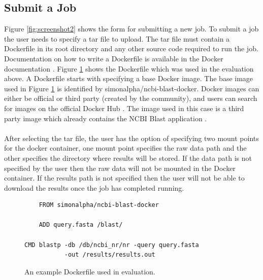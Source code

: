 \documentclass{sig-alternate-05-2015}
\begin{document}
\subsection{Submit a Job}
Figure \ref{fig:screenshot2} shows the form for submitting a new job. 
To submit a job the user needs to specify a tar file to upload. The tar file must contain a Dockerfile in its root directory and any other source code required to run the job. Documentation on how to write a Dockerfile is available in the Docker documentation \cite{dockerfile}. Figure \ref{fig:dockerfile} shows the Dockerfile which was used in the evaluation above. A Dockerfile starts with specifying a base Docker image. The base image used in Figure \ref{fig:dockerfile} is identified by simonalpha/ncbi-blast-docker. Docker images can either be official or third party (created by the community), and users can search for images on the official Docker Hub \cite{dockerhub}. The image used in this case is a third party image which already contains the NCBI Blast application \cite{dockerblast}.
\\\\
After selecting the tar file, the user has the option of specifying two mount points for the docker container, one mount point specifies the raw data path and the other specifies the directory where results will be stored. If the data path is not specified by the user then the raw data will not be mounted in the Docker container. If the results path is not specified then the user will not be able to download the results once the job has completed running.

\begin{figure}
	\begin{verbatim}
	FROM simonalpha/ncbi-blast-docker

	ADD query.fasta /blast/

CMD blastp -db /db/ncbi_nr/nr -query query.fasta 
           -out /results/results.out
	\end{verbatim}
	\caption{An example Dockerfile used in evaluation.}
\label{fig:dockerfile}
\end{figure}
\end{document}
